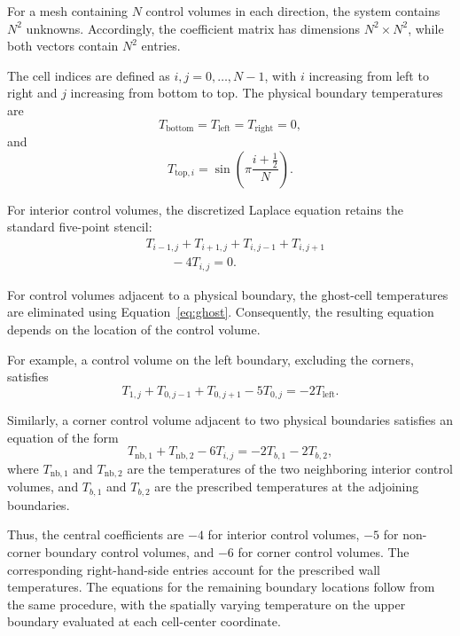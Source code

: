 For a mesh containing $N$ control volumes in each direction, the system contains $N^2$ unknowns. Accordingly, the coefficient matrix has dimensions $N^2\times N^2$, while both vectors contain $N^2$ entries.

The cell indices are defined as $i,j=0,\ldots,N-1$, with $i$ increasing from left to right and $j$ increasing from bottom to top. The physical boundary temperatures are
\begin{equation}
T_{\mathrm{bottom}}
=
T_{\mathrm{left}}
=
T_{\mathrm{right}}
=
0,
\label{eq:implicit_zero_boundaries}
\end{equation}
and
\begin{equation}
T_{\mathrm{top},i}
=
\sin\left(
\pi\frac{i+\frac{1}{2}}{N}
\right).
\label{eq:implicit_top_boundary}
\end{equation}

For interior control volumes, the discretized Laplace equation retains the standard five-point stencil:
\begin{equation}
\begin{aligned}
&T_{i-1,j}
+T_{i+1,j}
+T_{i,j-1}
+T_{i,j+1}\\
&\qquad -4T_{i,j}=0.
\end{aligned}
\label{eq:implicit_interior}
\end{equation}

For control volumes adjacent to a physical boundary, the ghost-cell temperatures are eliminated using Equation~\ref{eq:ghost}. Consequently, the resulting equation depends on the location of the control volume.

For example, a control volume on the left boundary, excluding the corners, satisfies
\begin{equation}
T_{1,j}
+T_{0,j-1}
+T_{0,j+1}
-5T_{0,j}
=
-2T_{\mathrm{left}}.
\label{eq:implicit_left_boundary}
\end{equation}

Similarly, a corner control volume adjacent to two physical boundaries satisfies an equation of the form
\begin{equation}
T_{\mathrm{nb},1}
+
T_{\mathrm{nb},2}
-
6T_{i,j}
=
-2T_{b,1}
-
2T_{b,2},
\label{eq:implicit_corner}
\end{equation}
where $T_{\mathrm{nb},1}$ and $T_{\mathrm{nb},2}$ are the temperatures of the two neighboring interior control volumes, and $T_{b,1}$ and $T_{b,2}$ are the prescribed temperatures at the adjoining boundaries.

Thus, the central coefficients are $-4$ for interior control volumes, $-5$ for non-corner boundary control volumes, and $-6$ for corner control volumes. The corresponding right-hand-side entries account for the prescribed wall temperatures. The equations for the remaining boundary locations follow from the same procedure, with the spatially varying temperature on the upper boundary evaluated at each cell-center coordinate.


